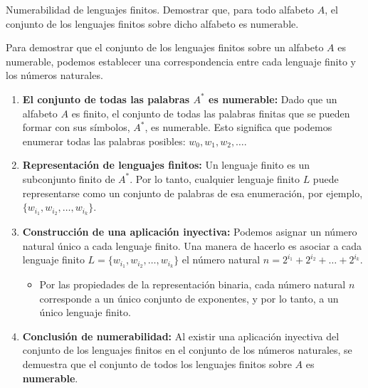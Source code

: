 \documentclass[12pt]{book} %
\begin{document}
\begin{ejercicio}
Numerabilidad de lenguajes finitos. Demostrar que, para todo alfabeto $A$, el conjunto de los lenguajes finitos sobre dicho alfabeto es numerable.
\end{ejercicio}

\begin{solucion}

Para demostrar que el conjunto de los lenguajes finitos sobre un alfabeto \(A\) es numerable, podemos establecer una correspondencia entre cada lenguaje finito y los números naturales.

\begin{enumerate}
    \item \textbf{El conjunto de todas las palabras \(A^*\) es numerable:} Dado que un alfabeto \(A\) es finito, el conjunto de todas las palabras finitas que se pueden formar con sus símbolos, \(A^*\), es numerable. Esto significa que podemos enumerar todas las palabras posibles: \(w_0, w_1, w_2, \dots\).

    \item \textbf{Representación de lenguajes finitos:} Un lenguaje finito es un subconjunto finito de \(A^*\). Por lo tanto, cualquier lenguaje finito \(L\) puede representarse como un conjunto de palabras de esa enumeración, por ejemplo, \(\{w_{i_1}, w_{i_2}, \dots, w_{i_k}\}\).

    \item \textbf{Construcción de una aplicación inyectiva:} Podemos asignar un número natural único a cada lenguaje finito. Una manera de hacerlo es asociar a cada lenguaje finito \(L = \{w_{i_1}, w_{i_2}, \dots, w_{i_k}\}\) el número natural \(n = 2^{i_1} + 2^{i_2} + \dots + 2^{i_k}\).
    \begin{itemize}
        \item Por las propiedades de la representación binaria, cada número natural \(n\) corresponde a un único conjunto de exponentes, y por lo tanto, a un único lenguaje finito.
    \end{itemize}

    \item \textbf{Conclusión de numerabilidad:} Al existir una aplicación inyectiva del conjunto de los lenguajes finitos en el conjunto de los números naturales, se demuestra que el conjunto de todos los lenguajes finitos sobre \(A\) es \textbf{numerable}.
\end{enumerate}

\end{solucion}
\end{document}
